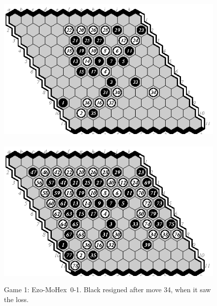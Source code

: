 \documentclass{icga}
\def\Eo{\mbox{\sc Ezo}}
\def\Mx{\mbox{\sc MoHex}}
\begin{document}
\begin{figure}[hbp]
\includegraphics[scale=1.3]{games/pix/01-em-0-1.eps}\hspace*{-1cm}\
\includegraphics[scale=1.3]{games/pix/01-em-completion.eps}
\caption{Game 1: \Eo-\Mx\ 0-1. Black resigned after move 34, when it saw the loss.}
\end{figure}
\end{document}

